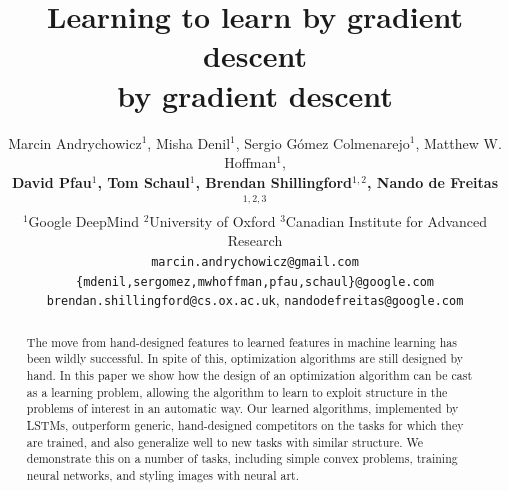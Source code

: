 \documentclass{article}
\title{Learning to learn by gradient descent\\\hspace{7.75em}by gradient descent}
\author{
Marcin Andrychowicz$^1$,
Misha Denil$^1$,
Sergio G\'omez Colmenarejo$^1$,
Matthew W. Hoffman$^1$,\\
\textbf{David Pfau$^1$,
Tom Schaul$^1$,
Brendan Shillingford$^{1,2}$,
Nando de Freitas$^{1,2,3}$}\\[0.5em]
$^1$Google DeepMind \quad $^2$University of Oxford \quad $^3$Canadian Institute for Advanced Research \\[0.5em]
\texttt{marcin.andrychowicz@gmail.com}\\
\texttt{\{mdenil,sergomez,mwhoffman,pfau,schaul\}@google.com}\\
\texttt{brendan.shillingford@cs.ox.ac.uk},
\texttt{nandodefreitas@google.com}
}
\begin{document}
\maketitle


\begin{abstract}
  The move from hand-designed features to learned features in machine learning
  has been wildly successful.  In spite of this, optimization algorithms are
  still designed by hand.  In this paper we show how the design of an
  optimization algorithm can be cast as a learning problem, allowing the
  algorithm to learn to exploit structure in the problems of interest in an
  automatic way.  Our learned algorithms, implemented by LSTMs, outperform
  generic, hand-designed competitors on the tasks for which they are trained,
  and also generalize well to new tasks with similar structure.  We demonstrate
  this on a number of tasks, including simple convex problems, training neural
  networks, and styling images with neural art.
\end{abstract}






{
\setlength{\bibsep}{0.4pt}
\renewcommand{\bibfont}{\small}
\titlespacing*{\section}{0pt}{0pt}{0pt}


}

\newpage
\appendix





\end{document}
